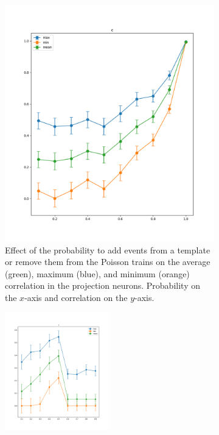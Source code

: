 \begin{figure}
\begin{subfigure}[t]{0.48\textwidth}
        \includegraphics[width=\textwidth]{poisson-train-c}
        \caption{Effect of the probability to add events from a template or remove them from the Poisson trains on the average (green), maximum (blue), and minimum (orange) correlation in the projection neurons. Probability on the $x$-axis and correlation on the $y$-axis.}
        \label{fig:finding-poisson-train-c}
      \end{subfigure}
      \begin{subfigure}[t]{\textwidth}
        \centering
        \includegraphics[width=0.5\textwidth]{poisson-train-l}

\end{subfigure}
\end{figure}
